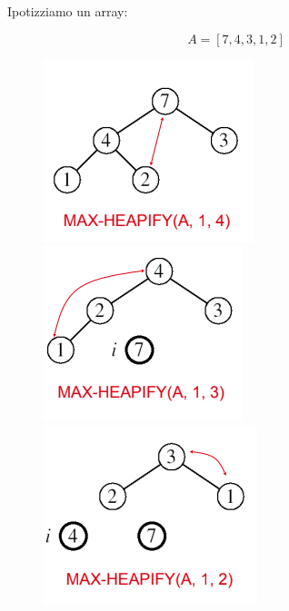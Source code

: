 \documentclass{article}
\begin{document}
    Ipotizziamo un array:

    \begin{equation}
        A=[7,4,3,1,2]
    \end{equation}
    
    \begin{figure}[htbp]
        \center
        \includegraphics[scale=0.6]{img/heapSort2.png}
        \includegraphics[scale=0.6]{img/heapSort3.png}
        \includegraphics[scale=0.6]{img/heapSort4.png}
    \end{figure}
\end{document}
